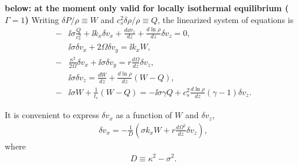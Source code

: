  {\bf below: at the moment only valid for locally isothermal
   equilibrium ($\Gamma=1$)} 
 Writing $\delta P /\rho \equiv W$ and $c_s^2\delta\rho/\rho\equiv Q$, 
 the linearized system of equations is 
 \begin{align}
   -&\ii\sigma \frac{Q}{c_s^2} + \ii k_x \delta v_x + \frac{d\dd
     v_z}{dz} + \frac{d\ln{\rho}}{dz}\delta v_z = 0,\\
   &\ii\sigma \delta v_x + 2\Omega\delta v_y = \ii k_x W,\\
   -&\frac{\kappa^2}{2\Omega}\delta v_x + \ii \sigma\delta v_y =
   r\frac{d\Omega}{dz}\delta v_z, \\
   & \ii\sigma\delta v_z = \frac{dW}{dz} +
   \frac{d\ln{\rho}}{dz}\left(W-Q\right), \\
   -&\ii\sigma W + \frac{1}{t_c}\left(W-Q\right) = -\ii\sigma\gamma Q +
   c_s^2\frac{d\ln{\rho}}{dz}\left(\gamma-1\right)\delta v_z.
 \end{align}

 It is convenient to express $\delta v_x$ as a function of $W$ and
 $\delta v_z$,
 \begin{align}
   \delta v_x = -\frac{1}{D}\left(\sigma k_x W +
     r\frac{d\Omega^2}{dz}\delta v_z\right),
 \end{align}
 where
 \begin{align}
   D \equiv \kappa^2 - \sigma^2.
 \end{align}